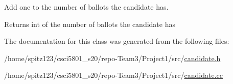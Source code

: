 Add one to the number of ballots the candidate has. 

\begin{DoxyReturn}{Returns}
int of the number of ballots the candidate has 
\end{DoxyReturn}


The documentation for this class was generated from the following files\+:\begin{DoxyCompactItemize}
\item 
/home/spitz123/csci5801\+\_\+s20/repo-\/\+Team3/\+Project1/src/\hyperlink{candidate_8h}{candidate.\+h}\item 
/home/spitz123/csci5801\+\_\+s20/repo-\/\+Team3/\+Project1/src/\hyperlink{candidate_8cc}{candidate.\+cc}\end{DoxyCompactItemize}
